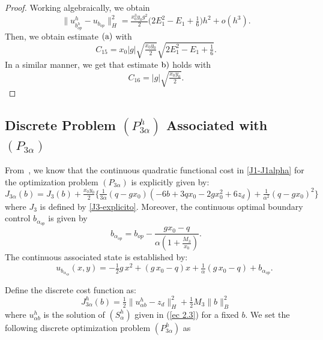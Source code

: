 \documentclass[axioms,article,submit,moreauthors]{Definitions/mdpi}
\begin{document}
 \begin{proof}
 Working algebraically, we obtain 
\[  \lVert {u^h_{b^h_{op}}} - u_{b_{op}}  \rVert^2 _H=\tfrac{x_0^3  y_0 g^2}{2} \Big(2E_1^2-E_1+\tfrac{1}{6} \Big) h^2+o(h^3). \]
Then, we obtain estimate $\rm (a)$ with
 \[C_{15}=x_0  |g| \sqrt{\tfrac{x_0 y_0}{2}}\sqrt{2E_1^2-E_1+\tfrac{1}{6} }.\]
 In a similar manner, we get that estimate $\rm{b})$ holds with
 \[C_{16}=|g|\sqrt{\tfrac{x_0 y_0}{2}}.\]
 \end{proof}
 
   \subsection{Discrete Problem  ${(P^h_{3\alpha})}$ Associated with $(P_{3\alpha})$} 
  
  
   From~\cite{BoGaTa2020}, we know that  the continuous quadratic  functional cost in \eqref{J1-J1alpha} for the optimization problem  $(P_{3\alpha})$  is explicitly given by: 
      \begin{equation}\label{J3alpha-explicito}
          J_{3\alpha}(b)= J_3(b) +\tfrac{x_0 y_0}{2}\Big\{ \tfrac{1}{3\alpha}  (q - g x_0) (-6b + 3 q x_0 - 2 g x_0^2 + 6 z_d) +  \tfrac{1}{\alpha^2} (  q- g x_0)^2 \Big\}
      \end{equation}
      where $J_3$ is defined by \eqref{J3-explicito}.
      Moreover, the continuous optimal boundary control $b_{\alpha_{op}}$ is given by
\begin{equation}\label{balphaop}
          b_{\alpha_{op}} =b_{op}-  \frac{ g x_0-q}{\alpha (1+ \tfrac{M_3}{x_0})} .
     \end{equation}
\noindent The continuous associated state is established by: 
     \begin{equation}\label{ualpha-balphaop}
\qquad u_{b_{\alpha_{op}}}(x,y) = -\tfrac{1}{2} g\, x^2 + (g\, x_0 - q) x + \tfrac{1}{\alpha} (g\,x_0 - q) +b_{\alpha_{op}} .
       \end{equation}
       
       
     
\vspace{.2cm}
    
\noindent Define the discrete cost function as:
\begin{equation}    
    { J^h_{3\alpha}} (b)=  \tfrac{1}{2} \lVert {u^h_{\alpha b}} - z_d \rVert^2_H +  \tfrac{1}{2} M_3 \lVert b \rVert ^2_B 
     \end{equation}
where ${u^h_{\alpha b}}$ is the solution of ${ (S^h_{\alpha })}$ given in (\ref{ec 2.3}) {for a fixed $b$}.  We set the following discrete optimization problem ${(P^h_{3\alpha})}$ as
\end{document}
